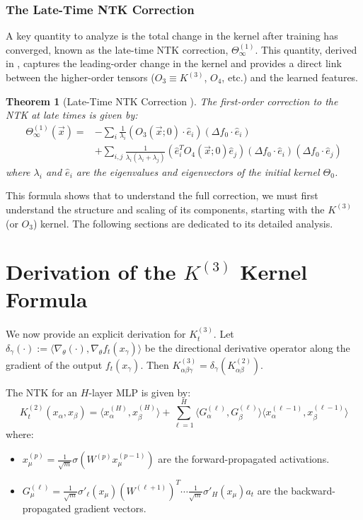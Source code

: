\documentclass{article}
\newtheorem{theorem}{Theorem}[section]
\begin{document}
\subsubsection{The Late-Time NTK Correction}
A key quantity to analyze is the total change in the kernel after training has converged, known as the late-time NTK correction, $\Theta^{(1)}_\infty$. This quantity, derived in \cite{large-width-feynman}, captures the leading-order change in the kernel and provides a direct link between the higher-order tensors ($O_3 \equiv K^{(3)}$, $O_4$, etc.) and the learned features.

\begin{theorem}[Late-Time NTK Correction \cite{large-width-feynman}]
The first-order correction to the NTK at late times is given by:
\begin{align}
\Theta^{(1)}_\infty(\vec{x}) = & -\sum_{i}\frac{1}{\lambda_{i}}(O_{3}(\vec{x};0)\cdot\hat{e}_{i})(\Delta f_{0}\cdot\hat{e}_{i}) \nonumber \\
& + \sum_{i,j}\frac{1}{\lambda_{i}(\lambda_{i}+\lambda_{j})}(\hat{e}_{i}^{T}O_{4}(\vec{x};0)\hat{e}_{j})(\Delta f_{0}\cdot \hat{e}_{i})(\Delta f_{0}\cdot \hat{e}_{j})
\label{eq:theta_correction}
\end{align}
where $\lambda_i$ and $\hat{e}_i$ are the eigenvalues and eigenvectors of the initial kernel $\Theta_0$.
\end{theorem}

This formula shows that to understand the full correction, we must first understand the structure and scaling of its components, starting with the $K^{(3)}$ (or $O_3$) kernel. The following sections are dedicated to its detailed analysis.

\newpage
\section{Derivation of the $K^{(3)}$ Kernel Formula}

We now provide an explicit derivation for $K^{(3)}_t$. Let $\delta_\gamma(\cdot) := \langle \nabla_\theta (\cdot), \nabla_\theta f_t(x_\gamma) \rangle$ be the directional derivative operator along the gradient of the output $f_t(x_\gamma)$. Then $K^{(3)}_{\alpha\beta\gamma} = \delta_\gamma(K^{(2)}_{\alpha\beta})$.

The NTK for an $H$-layer MLP is given by:
\begin{equation}
K^{(2)}_t(x_\alpha, x_\beta) = \langle x^{(H)}_\alpha, x^{(H)}_\beta \rangle + \sum_{\ell=1}^{H} \langle G^{(\ell)}_\alpha, G^{(\ell)}_\beta \rangle \langle x^{(\ell-1)}_\alpha, x^{(\ell-1)}_\beta \rangle
\end{equation}
where:
\begin{itemize}
    \item $x^{(p)}_\mu = \frac{1}{\sqrt{m}}\sigma(W^{(p)} x^{(p-1)}_\mu)$ are the forward-propagated activations.
    \item $G^{(\ell)}_\mu = \frac{1}{\sqrt{m}}\sigma'_\ell(x_\mu) (W^{(\ell+1)})^T \cdots \frac{1}{\sqrt{m}}\sigma'_H(x_\mu) a_t$ are the backward-propagated gradient vectors.
\end{itemize}
\end{document}

